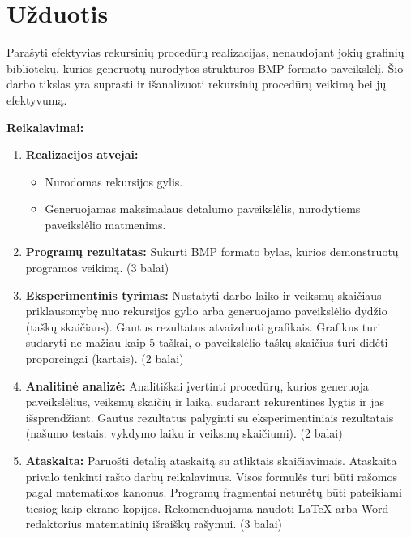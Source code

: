 \documentclass[a4paper,12pt]{article}
\begin{document}


\tableofcontents \newpage

\section{Užduotis}
Parašyti efektyvias rekursinių procedūrų realizacijas, nenaudojant jokių grafinių bibliotekų, kurios generuotų nurodytos struktūros BMP formato paveikslėlį. Šio darbo tikslas yra suprasti ir išanalizuoti rekursinių procedūrų veikimą bei jų efektyvumą.

\textbf{Reikalavimai:}
\begin{enumerate}
    \item \textbf{Realizacijos atvejai:}
    \begin{itemize}
        \item Nurodomas rekursijos gylis.
        \item Generuojamas maksimalaus detalumo paveikslėlis, nurodytiems paveikslėlio matmenims.
    \end{itemize}
    \item \textbf{Programų rezultatas:} Sukurti BMP formato bylas, kurios demonstruotų programos veikimą. (3 balai)
    \item \textbf{Eksperimentinis tyrimas:} Nustatyti darbo laiko ir veiksmų skaičiaus priklausomybę nuo rekursijos gylio arba generuojamo paveikslėlio dydžio (taškų skaičiaus). Gautus rezultatus atvaizduoti grafikais. Grafikus turi sudaryti ne mažiau kaip 5 taškai, o paveikslėlio taškų skaičius turi didėti proporcingai (kartais). (2 balai)
    \item \textbf{Analitinė analizė:} Analitiškai įvertinti procedūrų, kurios generuoja paveikslėlius, veiksmų skaičių ir laiką, sudarant rekurentines lygtis ir jas išsprendžiant. Gautus rezultatus palyginti su eksperimentiniais rezultatais (našumo testais: vykdymo laiku ir veiksmų skaičiumi). (2 balai)
    \item \textbf{Ataskaita:} Paruošti detalią ataskaitą su atliktais skaičiavimais. Ataskaita privalo tenkinti rašto darbų reikalavimus. Visos formulės turi būti rašomos pagal matematikos kanonus. Programų fragmentai neturėtų būti pateikiami tiesiog kaip ekrano kopijos. Rekomenduojama naudoti \LaTeX{} arba Word redaktorius matematinių išraiškų rašymui. (3 balai)
\end{enumerate}

\end{document}
